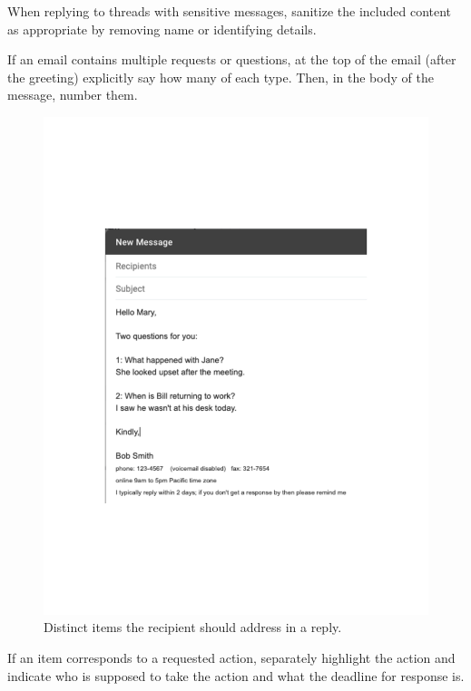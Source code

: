 When replying to threads with sensitive messages, sanitize the included content as appropriate by removing name or identifying details.

If an email contains multiple requests or questions, at the top of the email (after the greeting) explicitly say how many of each type. Then, in the body of the message, number them.

\begin{figure}
\includegraphics[width=1\textwidth]{images/email_two_questions.pdf}
\caption{Distinct items the recipient should address in a reply.}
\label{fig:email_two_questions}
\end{figure}

If an item corresponds to a requested action, separately highlight the action and indicate who is supposed to take the action and what the deadline for response is.

